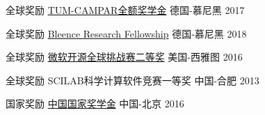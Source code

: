 




\begin{cvhonors}


\cvhonor
{全球奖励} %
{\href{}{TUM-CAMPAR全额奖学金} } %
{德国-慕尼黑} %
{2017} %

\cvhonor
{全球奖励} %
{\href{}{Bleence Research Fellowship} } %
{德国-慕尼黑} %
{2018} %

\cvhonor
{全球奖励} %
{\href{https://www.microsoft.com/en-us/research/academic-program/microsoft-open-source-challenge/}{微软开源全球挑战赛二等奖} } %
{美国-西雅图} %
{2016} %


\cvhonor
{全球奖励} %
{SCILAB科学计算软件竞赛一等奖} %
{中国-合肥} %
{2013} %








\cvhonor
{国家奖励} %
{\href{http://sice.bupt.edu.cn/info/1008/1546.htm}{中国国家奖学金}} %
{中国-北京} %
{2016} %


\end{cvhonors}
